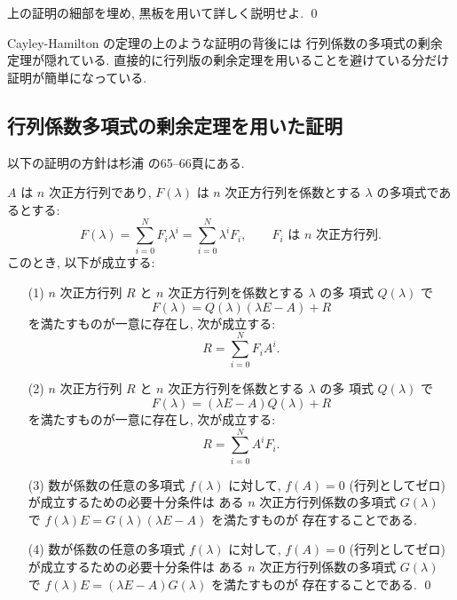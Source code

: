 \documentclass[12pt,twoside]{jarticle}
\begin{document}
\begin{question}
  上の証明の細部を埋め, 黒板を用いて詳しく説明せよ. \qed
\end{question}

Cayley-Hamilton の定理の上のような証明の背後には
行列係数の多項式の剰余定理が隠れている.  
直接的に行列版の剰余定理を用いることを避けている分だけ
証明が簡単になっている.


\subsection{行列係数多項式の剰余定理を用いた証明}
\label{sec:CH-remainder}


以下の証明の方針は杉浦 \cite{sugiura} の65--66頁にある.  

\begin{question}[行列係数多項式の剰余定理]
\label{q:matrix-remainder-theorem}
  $A$ は $n$ 次正方行列であり, 
  $F(\lambda)$ は $n$ 次正方行列を係数とする $\lambda$ の多項式であるとする:
  \begin{equation*}
    F(\lambda) = \sum_{i=0}^N F_i \lambda^i = \sum_{i=0}^N \lambda^i F_i,
    \qquad \text{$F_i$ は $n$ 次正方行列}.
  \end{equation*}
  このとき, 以下が成立する:
  \begin{enumerate}
  \item[(1)] $n$ 次正方行列 $R$ と $n$ 次正方行列を係数とする $\lambda$ の多 
    項式 $Q(\lambda)$ で
    \begin{equation*}
      F(\lambda) = Q(\lambda)(\lambda E - A) + R
    \end{equation*}
    を満たすものが一意に存在し, 次が成立する:
    \begin{equation*}
      R = \sum_{i=0}^N F_i A^i.
    \end{equation*}
  \item[(2)] $n$ 次正方行列 $R$ と $n$ 次正方行列を係数とする $\lambda$ の多 
    項式 $Q(\lambda)$ で
    \begin{equation*}
      F(\lambda) = (\lambda E - A)Q(\lambda) + R
    \end{equation*}
    を満たすものが一意に存在し, 次が成立する:
    \begin{equation*}
      R = \sum_{i=0}^N A^i F_i.
    \end{equation*}
  \item[(3)] 数が係数の任意の多項式 $f(\lambda)$ に対して, 
    $f(A)=0$ (行列としてゼロ) が成立するための必要十分条件は
    ある $n$ 次正方行列係数の多項式 $G(\lambda)$ 
    で $f(\lambda)E = G(\lambda)(\lambda E - A)$ を満たすものが
    存在することである.
  \item[(4)] 数が係数の任意の多項式 $f(\lambda)$ に対して, 
    $f(A)=0$ (行列としてゼロ) が成立するための必要十分条件は
    ある $n$ 次正方行列係数の多項式 $G(\lambda)$ 
    で $f(\lambda)E = (\lambda E - A)G(\lambda)$ を満たすものが
    存在することである.
    \qed
  \end{enumerate}
\end{question}
\end{document}
